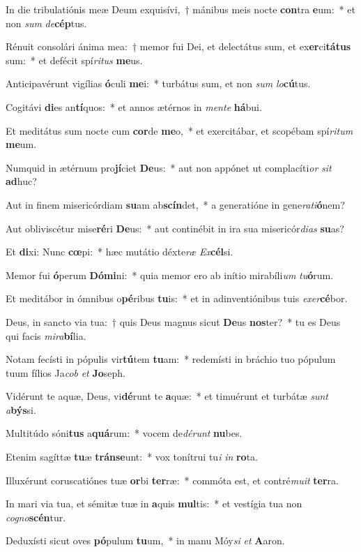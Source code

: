 \item In die tribulatiónis meæ Deum exquisívi,~† mánibus meis nocte \textbf{con}tra \textbf{e}um:~* et non \textit{sum} \textit{de}\textbf{cép}tus.
\item Rénuit consolári ánima mea:~† memor fui Dei, et delectátus sum, et ex\textbf{er}ci\textbf{tá}\textbf{tus} sum:~* et defécit spí\textit{ri}\textit{tus} \textbf{me}us.
\item Anticipavérunt vigílias \textbf{ó}culi \textbf{me}i:~* turbátus sum, et non \textit{sum} \textit{lo}\textbf{cú}tus.
\item Cogitávi \textbf{di}es an\textbf{tí}quos:~* et annos ætérnos in \textit{men}\textit{te} \textbf{há}bui.
\item Et meditátus sum nocte cum \textbf{cor}de \textbf{me}o,~* et exercitábar, et scopébam spí\textit{ri}\textit{tum} \textbf{me}um.
\item Numquid in ætérnum pro\textbf{jí}ciet \textbf{De}us:~* aut non appónet ut complacíti\textit{or} \textit{sit} \textbf{ad}huc?
\item Aut in finem misericórdiam \textbf{su}am ab\textbf{scín}det,~* a generatióne in gene\textit{ra}\textit{ti}\textbf{ó}nem?
\item Aut obliviscétur mise\textbf{ré}ri \textbf{De}us:~* aut continébit in ira sua misericór\textit{di}\textit{as} \textbf{su}as?
\item Et \textbf{di}xi: Nunc \textbf{cœ}pi:~* hæc mutátio déxte\textit{ræ} \textit{Ex}\textbf{cél}si.
\item Memor fui \textbf{ó}perum \textbf{Dó}\textbf{mi}ni:~* quia memor ero ab inítio mirabíli\textit{um} \textit{tu}\textbf{ó}rum.
\item Et meditábor in ómnibus o\textbf{pé}ribus \textbf{tu}is:~* et in adinventiónibus tuis \textit{ex}\textit{er}\textbf{cé}bor.
\item Deus, in sancto via tua:~† quis Deus magnus sicut \textbf{De}us \textbf{nos}ter?~* tu es Deus qui facis \textit{mi}\textit{ra}\textbf{bí}lia.
\item Notam fecísti in pópulis vir\textbf{tú}tem \textbf{tu}am:~* redemísti in bráchio tuo pópulum tuum fílios Ja\textit{cob} \textit{et} \textbf{Jo}seph.
\item Vidérunt te aquæ, Deus, vi\textbf{dé}runt te \textbf{a}quæ:~* et timuérunt et turbátæ \textit{sunt} \textit{a}\textbf{býs}si.
\item Multitúdo sóni\textbf{tus} a\textbf{quá}rum:~* vocem de\textit{dé}\textit{runt} \textbf{nu}bes.
\item Etenim sagíttæ \textbf{tu}æ \textbf{tráns}\textbf{e}unt:~* vox tonítrui tu\textit{i} \textit{in} \textbf{ro}ta.
\item Illuxérunt coruscatiónes tuæ \textbf{or}bi \textbf{ter}ræ:~* commóta est, et contré\textit{mu}\textit{it} \textbf{ter}ra.
\item In mari via tua, et sémitæ tuæ in \textbf{a}quis \textbf{mul}tis:~* et vestígia tua non \textit{co}\textit{gno}\textbf{scén}tur.
\item Deduxísti sicut oves \textbf{pó}pulum \textbf{tu}um,~* in manu Móy\textit{si} \textit{et} \textbf{A}aron.

